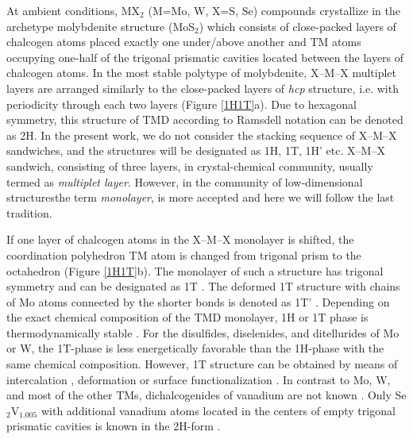 \documentclass[a4paperm]{article}
\begin{document}
At ambient conditions, MX$_2$ (M=Mo, W, X=S, Se) compounds crystallize in the archetype molybdenite structure (MoS$_2$) which consists of close-packed layers of chalcogen atoms placed exactly one under/above another and TM atoms occupying one-half of the trigonal prismatic cavities located between the layers of chalcogen atoms. 
In the most stable polytype of molybdenite, X--M--X multiplet layers are arranged similarly to the close-packed layers of {\it hcp} structure, i.e. with periodicity through each two layers (Figure \ref{1H1T}a).
Due to hexagonal symmetry, this structure of TMD according to Ramsdell notation can be denoted as 2H.
In the present work, we do not consider the stacking sequence of X--M--X sandwiches, and the structures will be designated as 1H, 1T, 1H' etc.
X--M--X sandwich, consisting of three layers, in crystal-chemical community, usually termed as {\it multiplet layer}.
However, in the community of low-dimensional structuresthe term {\it monolayer}, is more accepted and here we will follow the last tradition. 

If one layer of chalcogen atoms in the X--M--X monolayer is shifted, the coordination polyhedron TM atom is changed from trigonal prism to the octahedron (Figure \ref{1H1T}b).
The monolayer of such a structure has trigonal symmetry and can be designated as 1T \cite{huang2020recent}. 
The deformed 1T structure with chains of Mo atoms connected by the shorter bonds is denoted as 1T' \cite{huang2020recent}.
Depending on the exact chemical composition of the TMD monolayer, 1H or 1T phase is thermodynamically stable \cite{ataca2012stable}. 
For the disulfides, diselenides, and ditellurides of Mo or W, the  1T-phase is less energetically favorable than the 1H-phase with the same chemical composition. 
However, 1T structure can be obtained by means of intercalation \cite{kan2014structures, wang2014atomic}, deformation \cite{duerloo2014structural} or surface functionalization \cite{tang2015stabilization, voiry2015covalent}. 
In contrast to Mo, W, and most of the other TMs, dichalcogenides of vanadium are not known \cite{murphy1977preparation, le1979elaboration}. 
Only Se$_2$V$_{1.005}$ with additional vanadium atoms located in the centers of empty trigonal prismatic cavities is known in the 2H-form \cite{rigoult1982}.
\end{document}
